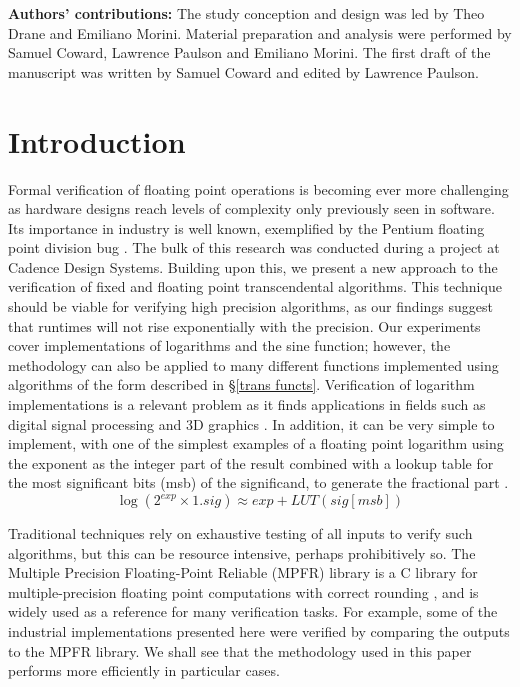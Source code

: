 \documentclass{fac}
\begin{document}
\noindent\textbf{Authors' contributions:} The study conception and design was led by Theo Drane and Emiliano Morini. Material preparation and analysis were performed by Samuel Coward, Lawrence Paulson and Emiliano Morini. The first draft of the manuscript was written by Samuel Coward and edited by Lawrence Paulson.

\section{Introduction}
\label{intro}
Formal verification of floating point operations is becoming ever more challenging as hardware designs reach levels of complexity only previously seen in software. Its importance in industry is well known, exemplified by the Pentium floating point division bug \cite{pratt1995anatomy}. The bulk of this research was conducted during a project at Cadence Design Systems. Building upon this, we present a new approach to the verification of fixed and floating point transcendental algorithms. This technique should be viable for verifying high precision algorithms, as our findings suggest that runtimes will not rise exponentially with the precision.  Our experiments cover implementations of logarithms and the sine function; however, the methodology can also be applied to many different functions implemented using algorithms of the form described in \S \ref{trans functs}. Verification of logarithm implementations is a relevant problem as it finds applications in fields such as digital signal processing and 3D graphics \cite{lewis1995114,harris2001powering}. In addition, it can be very simple to implement, with one of the simplest examples of a floating point logarithm using the exponent as the integer part of the result combined with a lookup table for the most significant bits (msb) of the significand, to generate the fractional part \cite{harris2001powering}.
\begin{equation*}
    \log(2^{\textit{exp}} \times 1.sig) \approx \textit{exp} + LUT(\textit{sig}[msb])
\end{equation*}

Traditional techniques rely on exhaustive testing of all inputs to verify such algorithms, but this can be resource intensive, perhaps prohibitively so. The Multiple Precision Floating-Point Reliable (MPFR) library is a C library for multiple-precision floating point computations with correct rounding \cite{fousse2007mpfr}, and is widely used as a reference for many verification tasks. For example, some of the industrial implementations presented here were verified by comparing the outputs to the MPFR library. We shall see that the methodology used in this paper performs more efficiently in particular cases. 
\end{document}
